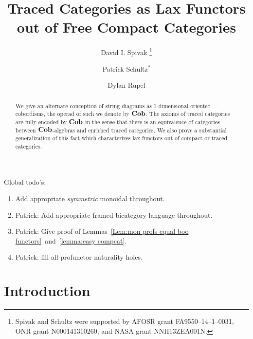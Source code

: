 \documentclass[12pt,oneside,article,draft]{memoir}
\title{Traced Categories as Lax Functors out of Free Compact Categories}
\author{
   David I. Spivak
      \thanks{Spivak and Schultz were supported by AFOSR grant FA9550--14--1--0031, ONR grant N000141310260, and NASA grant NNH13ZEA001N.}
   \and Patrick Schultz${}^*$%
   \and Dylan Rupel
}
\begin{document}
\tightlists
\firmlists

\maketitle
\begin{abstract}
   We give an alternate conception of string diagrams as 1-dimensional oriented cobordisms, the operad of such we denote by $\mathbf{Cob}$.
   The axioms of traced categories are fully encoded by $\mathbf{Cob}$ in the sense that there is an equivalence of categories between $\mathbf{Cob}$-algebras and enriched traced categories.
   We also prove a substantial generalization of this fact which characterizes lax functors out of compact or traced categories.
\end{abstract}
Global todo's:
\begin{enumerate}
   \item Add appropriate {\em symmetric\/} monoidal throughout.
   \item Patrick: Add appropriate framed bicategory language throughout.
   \item Patrick: Give proof of Lemmas~\ref{Lem:mon profs equal boo functors}~and~\ref{lemma:easy compcat}.
   \item Patrick: fill all profunctor naturality holes.
\end{enumerate}
\listoftodos

\setcounter{tocdepth}{1}
\tableofcontents*

\chapter{Introduction}
\end{document}
